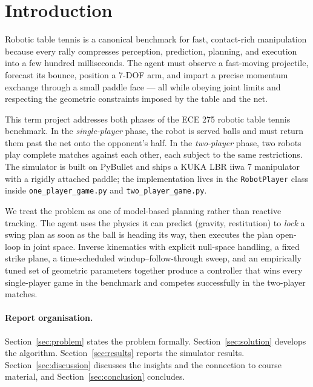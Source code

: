 \section{Introduction}
\label{sec:introduction}

Robotic table tennis is a canonical benchmark for fast, contact-rich manipulation
because every rally compresses perception, prediction, planning, and execution
into a few hundred milliseconds. The agent must observe a fast-moving projectile,
forecast its bounce, position a 7-DOF arm, and impart a precise momentum
exchange through a small paddle face --- all while obeying joint limits and
respecting the geometric constraints imposed by the table and the net.

This term project addresses both phases of the ECE 275 robotic table tennis
benchmark. In the \emph{single-player} phase, the robot is served balls and
must return them past the net onto the opponent's half. In the
\emph{two-player} phase, two robots play complete matches against each other,
each subject to the same restrictions. The simulator is built on PyBullet and
ships a KUKA LBR iiwa 7 manipulator with a rigidly attached paddle; the
implementation lives in the \texttt{RobotPlayer} class inside
\texttt{one\_player\_game.py} and \texttt{two\_player\_game.py}.

We treat the problem as one of model-based planning rather than reactive
tracking. The agent uses the physics it can predict (gravity, restitution) to
\emph{lock} a swing plan as soon as the ball is heading its way, then executes
the plan open-loop in joint space. Inverse kinematics with explicit
null-space handling, a fixed strike plane, a time-scheduled
windup--follow-through sweep, and an empirically tuned set of geometric
parameters together produce a controller that wins every single-player game
in the benchmark and competes successfully in the two-player matches.

\paragraph{Report organisation.}
Section~\ref{sec:problem} states the problem formally. Section~\ref{sec:solution}
develops the algorithm. Section~\ref{sec:results} reports the simulator results.
Section~\ref{sec:discussion} discusses the insights and the connection to course
material, and Section~\ref{sec:conclusion} concludes.
